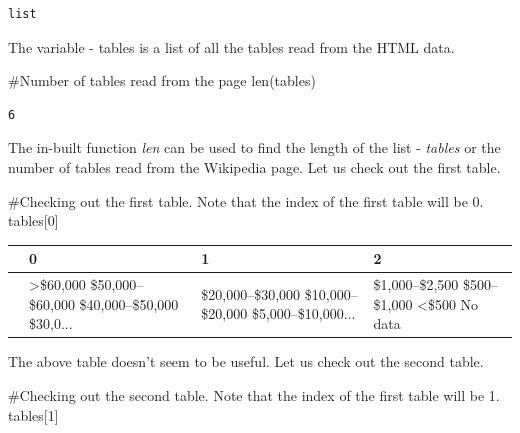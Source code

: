 \documentclass[
  letterpaper,
  DIV=11,
  numbers=noendperiod]{scrreprt}
\newenvironment{Shaded}{\begin{snugshade}}{\end{snugshade}}
\newcommand{\BuiltInTok}[1]{\textcolor[rgb]{0.00,0.23,0.31}{#1}}
\newcommand{\CommentTok}[1]{\textcolor[rgb]{0.37,0.37,0.37}{#1}}
\newcommand{\DecValTok}[1]{\textcolor[rgb]{0.68,0.00,0.00}{#1}}
\newcommand{\NormalTok}[1]{\textcolor[rgb]{0.00,0.23,0.31}{#1}}
\begin{document}
\begin{verbatim}
list
\end{verbatim}

The variable - tables is a list of all the tables read from the HTML
data.

\begin{Shaded}
\begin{Highlighting}[]
\CommentTok{\#Number of tables read from the page}
\BuiltInTok{len}\NormalTok{(tables)}
\end{Highlighting}
\end{Shaded}

\begin{verbatim}
6
\end{verbatim}

The in-built function \emph{len} can be used to find the length of the
list - \emph{tables} or the number of tables read from the Wikipedia
page. Let us check out the first table.

\begin{Shaded}
\begin{Highlighting}[]
\CommentTok{\#Checking out the first table. Note that the index of the first table will be 0.}
\NormalTok{tables[}\DecValTok{0}\NormalTok{]}
\end{Highlighting}
\end{Shaded}

\begin{longtable}[]{@{}llll@{}}
\toprule\noalign{}
& 0 & 1 & 2 \\
\midrule\noalign{}
\endhead
\bottomrule\noalign{}
\endlastfoot
0 & \textgreater\$60,000 \$50,000--\$60,000 \$40,000--\$50,000 \$30,0...
& \$20,000--\$30,000 \$10,000--\$20,000 \$5,000--\$10,000... &
\$1,000--\$2,500 \$500--\$1,000 \textless\$500 No data \\
\end{longtable}

The above table doesn't seem to be useful. Let us check out the second
table.

\begin{Shaded}
\begin{Highlighting}[]
\CommentTok{\#Checking out the second table. Note that the index of the first table will be 1.}
\NormalTok{tables[}\DecValTok{1}\NormalTok{]}
\end{Highlighting}
\end{Shaded}
\end{document}
